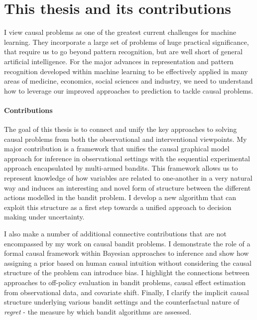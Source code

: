 \documentclass[11pt,a4paper,twoside]{report}
\theoremstyle{plain}
\theoremstyle{definition}
\begin{document}
\section{This thesis and its contributions}

I view causal problems as one of the greatest current challenges for machine learning. They incorporate a large set of problems of huge practical significance, that require us to go beyond pattern recognition, but are well short of general artificial intelligence. For the major advances in representation and pattern recognition developed within machine learning to be effectively applied in many areas of medicine, economics, social sciences and industry, we need to understand how to leverage our improved approaches to prediction to tackle causal problems. 

\paragraph{Contributions} The goal of this thesis is to connect and unify the key approaches to solving causal problems from both the observational and interventional viewpoints. My major contribution is a framework that unifies the causal graphical model approach for inference in observational settings with the sequential experimental approach encapsulated by multi-armed bandits. This framework allows us to represent knowledge of how variables are related to one-another in a very natural way and induces an interesting and novel form of structure between the different actions modelled in the bandit problem. I develop a new algorithm that can exploit this structure as a first step towards a unified approach to decision making under uncertainty. 

I also make a number of additional connective contributions that are not encompassed by my work on causal bandit problems. I demonstrate the role of a formal causal framework within Bayesian approaches to inference and show how assigning a prior based on human causal intuition without considering the causal structure of the problem can introduce bias. I highlight the connections between approaches to off-policy evaluation in bandit problems, causal effect estimation from observational data, and covariate shift. Finally, I clarify the implicit causal structure underlying various bandit settings and the counterfactual nature of \emph{regret} - the measure by which bandit algorithms are assessed.
\end{document}

